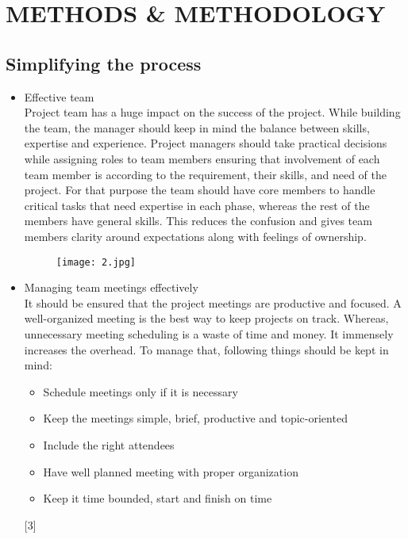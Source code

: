\documentclass[a4paper,12pt]{article}
\begin{document}
\pagebreak
\section{METHODS \& METHODOLOGY }

\subsection{Simplifying the process }
\begin{itemize}
    \item Effective team
    \\Project team has a huge impact on the success of the project. While building the team, the manager should keep in mind the balance between skills, expertise and experience. Project managers should take practical decisions while assigning roles to team members ensuring that involvement of each team member is according to the requirement, their skills, and need of the project. For that purpose the team should have core members to handle critical tasks that need expertise in each phase, whereas the rest of the members have general skills.  This reduces the confusion and gives team members clarity around expectations along with feelings of ownership.
        \begin{figure}[h!]
      \raggedleft
      \texttt{[image: 2.jpg]} 
    \end{figure}

    \item Managing team meetings effectively
   \\It should be ensured that the project meetings are productive and focused. A well-organized meeting is the best way to keep projects on track. Whereas, unnecessary meeting scheduling is a waste of time and money. It immensely increases the overhead. To manage that, following things should be kept in mind:
   \begin{itemize}%
  \renewcommand{\labelitemi}{$\Rightarrow$}
 \item Schedule meetings only if it is necessary
 \item Keep the meetings simple, brief, productive and topic-oriented
 \item Include the right attendees
 \item Have well planned meeting with proper organization
 \item Keep it time bounded, start and finish on time
\end{itemize}
[3]


\end{itemize}
\end{document}
